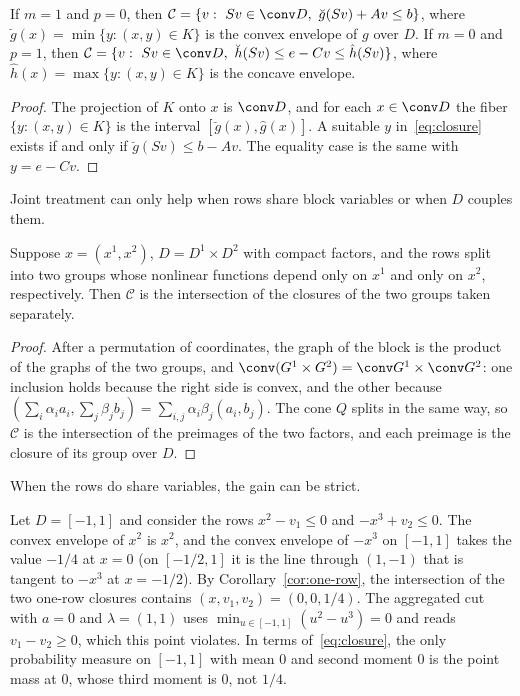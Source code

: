 \begin{corollary}\label{cor:one-row}
If $m=1$ and $p=0$, then $\mathcal C=\{v:\ Sv\in\conv D,\ \breve g(Sv)+Av\le b\}$,
where $\breve g(x)=\min\{y:(x,y)\in K\}$ is the convex envelope of $g$ over
$D$. If $m=0$ and $p=1$, then
$\mathcal C=\{v:\ Sv\in\conv D,\ \breve h(Sv)\le e-Cv\le\hat h(Sv)\}$, where
$\hat h(x)=\max\{y:(x,y)\in K\}$ is the concave envelope.
\end{corollary}

\begin{proof}
The projection of $K$ onto $x$ is $\conv D$, and for each $x\in\conv D$
the fiber $\{y:(x,y)\in K\}$ is the interval $[\breve g(x),\hat g(x)]$. A
suitable $y$ in~\eqref{eq:closure} exists if and only if
$\breve g(Sv)\le b-Av$. The equality case is the same with $y=e-Cv$.
\end{proof}

Joint treatment can only help when rows share block variables or when
$D$ couples them.

\begin{proposition}\label{prop:product}
Suppose $x=(x^1,x^2)$, $D=D^1\times D^2$ with compact factors, and the
rows split into two groups whose nonlinear functions depend only on $x^1$
and only on $x^2$, respectively. Then $\mathcal C$ is the intersection of the
closures of the two groups taken separately.
\end{proposition}

\begin{proof}
After a permutation of coordinates, the graph of the block is the product
of the graphs of the two groups, and
$\conv(G^1\times G^2)=\conv G^1\times\conv G^2$: one inclusion holds
because the right side is convex, and the other because
$(\sum_i\alpha_ia_i,\sum_j\beta_jb_j)=\sum_{i,j}\alpha_i\beta_j(a_i,b_j)$.
The cone $Q$ splits in the same way, so $\mathcal C$ is the intersection of the
preimages of the two factors, and each preimage is the closure of its group
over $D$.
\end{proof}

When the rows do share variables, the gain can be strict.

\begin{example}\label{ex:two-rows}
Let $D=[-1,1]$ and consider the rows $x^2-v_1\le0$ and $-x^3+v_2\le0$.
The convex envelope of $x^2$ is $x^2$, and the convex envelope of $-x^3$ on
$[-1,1]$ takes the value $-1/4$ at $x=0$ (on $[-1/2,1]$ it is the line
through $(1,-1)$ that is tangent to $-x^3$ at $x=-1/2$). By
Corollary~\ref{cor:one-row}, the intersection of the two one-row
closures contains $(x,v_1,v_2)=(0,0,1/4)$. The aggregated cut with $a=0$
and $\lambda=(1,1)$ uses $\min_{u\in[-1,1]}(u^2-u^3)=0$ and reads
$v_1-v_2\ge0$, which this point violates. In terms of~\eqref{eq:closure},
the only probability measure on $[-1,1]$ with mean $0$ and second moment
$0$ is the point mass at $0$, whose third moment is $0$, not $1/4$.
\end{example}

